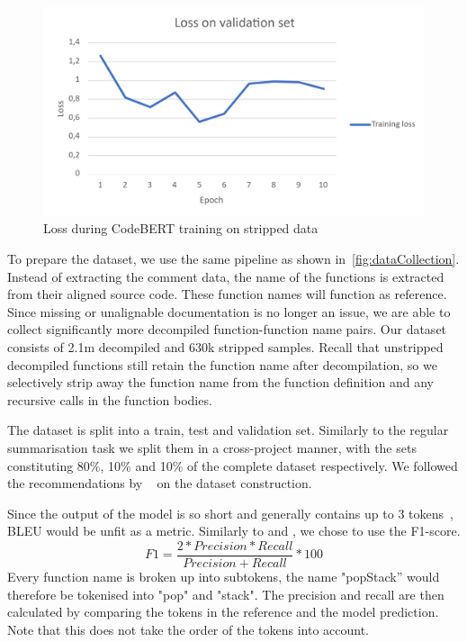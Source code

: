 \begin{figure}[h]
  \centering
  \includegraphics[width=\linewidth]{img/ExtremeLoss.png}
  \caption{Loss during CodeBERT training on stripped data}
  \label{fig:ExtremeLoss}
\end{figure}

To prepare the dataset, we use the same pipeline as shown in~\ref{fig:dataCollection}. Instead of extracting the comment data, the name of the functions is extracted from their aligned source code. These function names will function as reference. Since missing or unalignable documentation is no longer an issue, we are able to collect significantly more decompiled function-function name pairs. Our dataset consists of 2.1m decompiled and 630k stripped samples. Recall that unstripped decompiled functions still retain the function name after decompilation, so we selectively strip away the function name from the function definition and any recursive calls in the function bodies. 

The dataset is split into a train, test and validation set. Similarly to the regular summarisation task we split them in a cross-project manner, with the sets constituting 80\%, 10\% and 10\% of the complete dataset respectively. We followed the recommendations by ~\citeauthor{recommend_summarization} on the dataset construction. 

Since the output of the model is so short and generally contains up to 3 tokens~\cite{ExtremeSummarization}, BLEU would be unfit as a metric. Similarly to \citeauthor{ExtremeSummarization} and \citeauthor{PolyglotCodeBERT}, we chose to use the F1-score.
\[\mathit{F1} = \frac{2*\mathit{Precision}*\mathit{Recall}}{\mathit{Precision}+\mathit{Recall}} * 100\] 
Every function name is broken up into subtokens, the name "popStack'' would therefore be tokenised into "pop" and "stack". The precision and recall are then calculated by comparing the tokens in the reference and the model prediction. Note that this does not take the order of the tokens into account.


